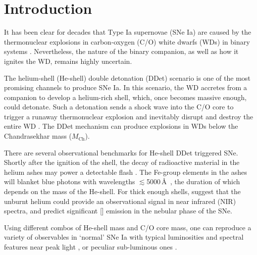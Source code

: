 \documentclass[twocolumn]{aastex631}
\newcommand{\Mch}{$M_\mathrm{Ch}$}
\begin{document}

\section{Introduction} \label{sec:intro}
It has been clear for decades that Type Ia supernovae (SNe Ia) are caused by the thermonuclear explosions in carbon-oxygen (C/O) white dwarfs (WDs) in binary systems \citep[see][for a review]{Maoz_2014}. Nevertheless, the nature of the binary companion, as well as how it ignites the WD, remains highly uncertain. 

The helium-shell (He-shell) double detonation (DDet) scenario is one of the most promising channels to produce SNe Ia. In this scenario, the WD accretes from a companion to develop a helium-rich shell, which, once becomes massive enough, could detonate. Such a detonation sends a shock wave into the C/O core to trigger a runaway thermonuclear explosion and inevitably disrupt and destroy the entire WD \citep{Nomoto_1982a, Nomoto_1982b, Woosley_1986, Livne_1990, Woosley_1994, Livne_1995}. The DDet mechanism can produce explosions in WDs below the Chandrasekhar mass (\Mch).

There are several observational benchmarks for He-shell DDet triggered SNe. Shortly after the ignition of the shell, the decay of radioactive material in the helium ashes may power a detectable flash \citep{Woosley_1994,Fink_DD_2010,Kromer_DD_2010}. The Fe-group elements in the ashes will blanket blue photons with wavelengths $\lesssim$5000\,\AA\ \citep{Kromer_DD_2010}, the duration of which depends on the mass of the He-shell. For thick enough shells, \citet{Boyle2017_Helium} suggest that the unburnt helium could provide an observational signal in near infrared (NIR) spectra, and \citet{polin_nebular_2021} predict significant [] emission in the nebular phase of the SNe.

Using different combos of He-shell mass and C/O core mass, one can reproduce a variety of observables in `normal' SNe Ia with typical luminosities and spectral features near peak light \citep[e.g.,][]{polin_observational_2019,Shen_2021}, or peculiar sub-luminous ones \citep[e.g.,][]{polin_observational_2019}. 
\end{document}
